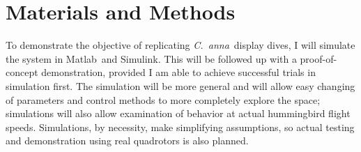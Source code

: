 \documentclass[onecolumn,10pt]{IEEEtran}
\newcommand{\Canna}{\emph{C.~anna}}
\newcommand{\MATLAB}{Matlab}
\begin{document}
\section{Materials and Methods}
To demonstrate the objective of replicating \Canna\ display dives,  I will simulate the system in \MATLAB\ and Simulink.  This will be followed up with a proof-of-concept demonstration, provided I am able to achieve successful trials in simulation first. The simulation will be more general and will allow easy changing of parameters and control methods to more completely explore the space; simulations will also allow examination of behavior at actual hummingbird flight speeds. Simulations, by necessity, make simplifying assumptions, so actual testing and demonstration using real quadrotors is also planned.  
\end{document}
